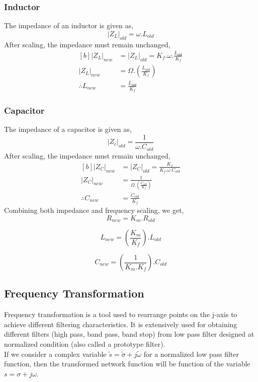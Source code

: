 \documentclass{lab_sheet}
\begin{document}
\subsubsection*{Inductor}
The impedance of an inductor is given as, 
$$
|Z_L|_{old}=\omega.L_{old}
$$
After scaling, the impedance must remain unchanged,
\begin{equation}
   \begin{aligned}[b]
      |Z_L|_{new}&=|Z_L|_{old}=K_f.\omega.\frac{L_{old}}{K_f}\\
      |Z_L|_{new}&=\Omega.\left(\frac{L_{old}}{K_f}\right)\\
      \therefore L_{new}&=\frac{L_{old}}{K_f}
   \end{aligned}
   \label{eqn:l_freq}
\end{equation}

\subsubsection*{Capacitor}
The impedance of a capacitor is given as, 
$$
|Z_c|_{old}=\frac{1}{\omega.C_{old}}
$$
After scaling, the impedance must remain unchanged,
\begin{equation}
   \begin{aligned}[b]
      |Z_C|_{new}&=|Z_C|_{old}=\frac{K_f}{K_f.\omega.C_{old}}\\
      |Z_C|_{new}&=\frac{1}{\Omega.\left(\frac{C_{old}}{K_f}\right)}\\
      \therefore C_{new}&=\frac{C_{old}}{K_f}
   \end{aligned}
   \label{eqn:c_freq}
\end{equation}
Combining both impedance and frequency scaling, we get,
\begin{equation}
   R_{new}=K_m.R_{old}
   \label{eqn:r_mag_freq}
\end{equation}

\begin{equation}
   L_{new}=\left(\frac{K_m}{K_f}\right).L_{old}
   \label{eqn:l_mag_freq}
\end{equation}

\begin{equation}
   C_{new}=\left(\frac{1}{K_m.K_f}\right).C_{old}
   \label{eqn:c_mag_freq}
\end{equation}

\subsection{Frequency Transformation}
Frequency transformation is a tool used to rearrange points on the j-axis to achieve different filtering characteristics. It is extensively used for obtaining different filters (high pass, band pass, band stop) from low pass filter designed at normalized condition (also called a prototype filter).
\\
If we consider a complex variable $\tilde{s}=\tilde{\sigma}+j\tilde{\omega}$ for a normalized low pass filter function, then the transformed network function will be function of the variable $s=\sigma+j\omega$.
\end{document}
